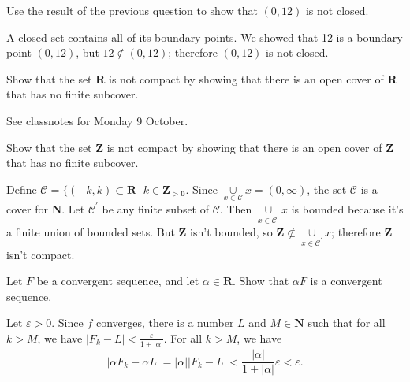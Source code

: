 \documentclass[12pt, fleqn, answers]{exam}
\newcommand{\reals}{\mathbf{R}}
\newcommand{\integers}{\mathbf{Z}}
\begin{document}
\begin{questions}
\begin{solution}
\end{solution}

\question  Use the result of the previous question to show that \((0,12)\) is not
closed.

\begin{solution}%
A closed set contains all of its boundary points. We showed that 12 is a boundary point \((0,12)\), but
\(12 \notin (0,12)\); therefore \((0,12)\) is not closed.
\end{solution}


\question  Show that the set \(\reals\) is not compact by 
showing that there is an open cover of \( \reals \) that has no
finite subcover.

\begin{solution} See classnotes for Monday 9 October.

\end{solution}

\question  Show that the set \(\mathbf{Z}\) is not compact by 
showing that there is an open cover of \( \mathbf{Z} \) that has no
finite subcover.

\begin{solution}%
  Define \(\mathcal{C} = \{(-k,k) \subset \reals \, | \, k \in \mathbf{\integers_{>0}}\). Since 
  \(\underset{x \in \mathcal{C}}{\cup} x = (0,\infty)\), the set \(\mathcal{C}\)
is a cover for  \(\mathbf{N}\). Let  \(\mathcal{C}^\prime\) be any finite subset
of  \(\mathcal{C}\). Then \(\underset{x \in \mathcal{C}^\prime}{\cup} x\) is
bounded because it's a finite union of bounded sets.  But \(\mathbf{\integers}\) isn't
bounded, so \(\mathbf{\integers} \not \subset \underset{x \in \mathcal{C}^\prime}{\cup} x\);
therefore \(\mathbf{\integers}\) isn't compact.
\end{solution}


\question Let \(F\) be a convergent sequence, and let \(\alpha \in
\reals\).  Show that \(\alpha F\) is a convergent sequence.



\begin{solution}%
Let \(\varepsilon > 0\). Since \(f\) converges, there is a number \(L\) and 
\(M \in \mathbf{N}\) such that for all \(k > M\), we have \(|F_k - L| < \frac{\varepsilon}{1 + |\alpha|}\).
For all \(k > M\), we have
\[
  |\alpha F_k - \alpha L| = |\alpha| |F_k - L|
                          < \frac{ |\alpha|}{1 + |\alpha|} \varepsilon
                          < \varepsilon.
\]


\end{solution}
\end{questions}
\end{document}
